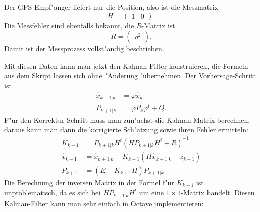 \begin{loesung}
Der GPS-Empf"anger liefert nur die Position, also ist die Messmatrix
\[
H=\begin{pmatrix}1&0\end{pmatrix}.
\]
Die Messfehler sind ebenfalls bekannt, die $R$-Matrix ist
\[
R=\begin{pmatrix}\varrho^2\end{pmatrix}.
\]
Damit ist der Messprozess vollst"andig beschrieben.

Mit diesen Daten kann man jetzt den Kalman-Filter konstruieren, die
Formeln aus dem Skript lassen sich ohne "Anderung "ubernehmen.
Der Vorhersage-Schritt ist
\begin{align*}
\hat x_{k+1|k}&=\varphi \hat x_k
\\
P_{k+1|k}&=\varphi P_k\varphi^t+Q.
\end{align*}
F"ur den Korrektur-Schritt muss man zun"achst die Kalman-Matrix 
berechnen, daraus kann man dann die korrigierte Sch"atzung sowie
ihren Fehler ermitteln:
\begin{align*}
K_{k+1}&=P_{k+1|k}H^t(HP_{k+1|k}H^t+R)^{-1}
\\
\hat x_{k+1}&=
\hat x_{k+1|k} - K_{k+1}(H\hat x_{k+1|k}-z_{k+1})
\\
P_{k+1}&=(E-K_{k+1}H)P_{k+1|k}
\end{align*}
Die Berechnung der inversen Matrix in der Formel f"ur $K_{k+1}$ ist
unproblematisch, da es sich bei $HP_{k+1|k}H^t$ um eine $1\times 1$-Matrix
handelt.
Diesen Kalman-Filter kann man sehr einfach in Octave implementieren:

\end{loesung}


